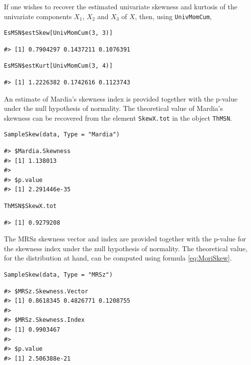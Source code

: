 If one wishes to recover the estimated univariate skewness and kurtosis of the univariate components \(X_1\), \(X_2\) and \(X_3\) of \(X\), then, using \texttt{UnivMomCum},

\begin{verbatim}
EsMSN$estSkew[UnivMomCum(3, 3)]
\end{verbatim}

\begin{verbatim}
#> [1] 0.7904297 0.1437211 0.1076391
\end{verbatim}

\begin{verbatim}
EsMSN$estKurt[UnivMomCum(3, 4)] 
\end{verbatim}

\begin{verbatim}
#> [1] 1.2226382 0.1742616 0.1123743
\end{verbatim}

An estimate of Mardia's skewness index is provided together with the p-value under the null hypothesis of normality. The theoretical value of Mardia's skewness can be recovered from the element \texttt{SkewX.tot} in the object \texttt{ThMSN}.

\begin{verbatim}
SampleSkew(data, Type = "Mardia")
\end{verbatim}

\begin{verbatim}
#> $Mardia.Skewness
#> [1] 1.138013
#> 
#> $p.value
#> [1] 2.291446e-35
\end{verbatim}

\begin{verbatim}
ThMSN$SkewX.tot
\end{verbatim}

\begin{verbatim}
#> [1] 0.9279208
\end{verbatim}

The MRSz skewness vector and index are provided together with the p-value for the skewness index under the null hypothesis of normality. The theoretical value, for the distribution at hand, can be computed using formula \eqref{eq:MoriSkew}.

\begin{verbatim}
SampleSkew(data, Type = "MRSz")
\end{verbatim}

\begin{verbatim}
#> $MRSz.Skewness.Vector
#> [1] 0.8618345 0.4826771 0.1208755
#> 
#> $MRSz.Skewness.Index
#> [1] 0.9903467
#> 
#> $p.value
#> [1] 2.506388e-21
\end{verbatim}


